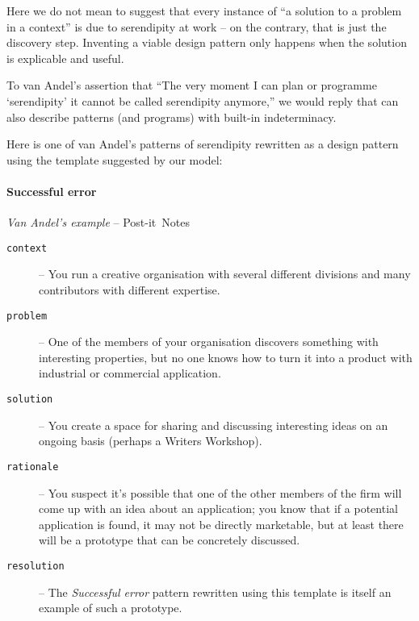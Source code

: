 Here we do not mean to suggest that every instance of ``a solution to a
problem in a context'' is due to serendipity at work -- on the
contrary, that is just the discovery step.  Inventing a viable design pattern
only happens when the solution is explicable and useful.

To van Andel's assertion that ``The very moment I can plan or
programme `serendipity' it cannot be called serendipity anymore,'' we
would reply that can also describe patterns (and programs) with
built-in indeterminacy.

Here is one of van Andel's patterns of serendipity rewritten as a
design pattern using the template suggested by our model:

\begin{mdframed}
\vspace{-.35cm}
\paragraph{Successful error}
\emph{Van Andel's example} -- Post-it\texttrademark\ Notes\\[.05cm]
\begin{description}
\item[{\tt context}] -- You run a creative organisation with several different divisions and many contributors with different expertise.  
\item[{\tt problem}] -- One of the members of your organisation
  discovers something with interesting properties, but no one
  knows how to turn it into a product with industrial or commercial application.
\item[{\tt solution}] -- You create a space for sharing and discussing
  interesting ideas on an ongoing basis (perhaps a Writers Workshop).
\item[{\tt rationale}] -- You suspect it's possible that one of the
  other members of the firm will come up with an idea about an
  application; you know that if a potential application is found, it
  may not be directly marketable, but at least there will be a
  prototype that can be concretely discussed.
\item[{\tt resolution}] -- The \emph{Successful error} pattern
  rewritten using this template is itself an example of such a
  prototype.
\end{description}
\end{mdframed}
